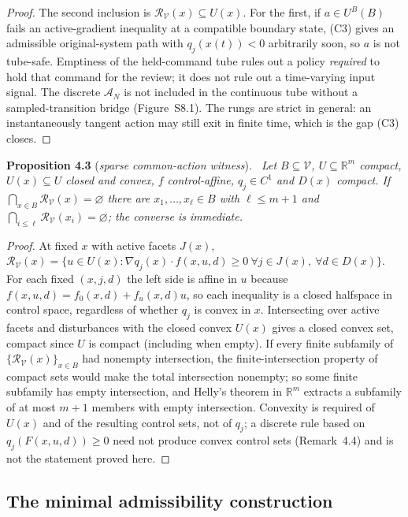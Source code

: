 \documentclass[11pt,a4paper]{article}
\theoremstyle{plain}
\theoremstyle{definition}
\theoremstyle{remark}
\newenvironment{restated}[2]{\par\medskip\noindent\textbf{#1} (\textit{#2}).\ \itshape}{\par\medskip}
\newcommand{\R}{\mathbb{R}}
\newcommand{\cV}{\mathcal{V}}
\newcommand{\cR}{\mathcal{R}}
\newcommand{\cA}{\mathcal{A}}
\newcommand{\hyp}[1]{\textup{(#1)}}
\begin{document}
\begin{proof}
The second inclusion is $\cR_\cV(x)\subseteq U(x)$. For the first, if $a\in U^B(B)$ fails an active-gradient inequality at a compatible boundary state, \hyp{C3} gives an admissible original-system path with $q_j(x(t))<0$ arbitrarily soon, so $a$ is not tube-safe. Emptiness of the held-command tube rules out a policy \emph{required} to hold that command for the review; it does not rule out a time-varying input signal. The discrete $\cA_N$ is not included in the continuous tube without a sampled-transition bridge (Figure~S8.1). The rungs are strict in general: an instantaneously tangent action may still exit in finite time, which is the gap \hyp{C3} closes.
\end{proof}

\begin{restated}{Proposition 4.3}{sparse common-action witness}\label{S:helly}
Let $B\subseteq\cV$, $U\subseteq\R^m$ compact, $U(x)\subseteq U$ closed and convex, $f$ control-affine, $q_j\in C^1$ and $D(x)$ compact. If $\bigcap_{x\in B}\cR_\cV(x)=\varnothing$ there are $x_1,\dots,x_\ell\in B$ with $\ell\le m+1$ and $\bigcap_{i\le\ell}\cR_\cV(x_i)=\varnothing$; the converse is immediate.
\end{restated}

\begin{proof}
At fixed $x$ with active facets $J(x)$, $\cR_\cV(x)=\{u\in U(x):\nabla q_j(x)\cdot f(x,u,d)\ge0\ \forall j\in J(x),\ \forall d\in D(x)\}$. For each fixed $(x,j,d)$ the left side is affine in $u$ because $f(x,u,d)=f_0(x,d)+f_u(x,d)u$, so each inequality is a closed halfspace in control space, regardless of whether $q_j$ is convex in $x$. Intersecting over active facets and disturbances with the closed convex $U(x)$ gives a closed convex set, compact since $U$ is compact (including when empty). If every finite subfamily of $\{\cR_\cV(x)\}_{x\in B}$ had nonempty intersection, the finite-intersection property of compact sets would make the total intersection nonempty; so some finite subfamily has empty intersection, and Helly's theorem in $\R^m$ \citep{helly1923} extracts a subfamily of at most $m+1$ members with empty intersection. Convexity is required of $U(x)$ and of the resulting control sets, not of $q_j$; a discrete rule based on $q_j(F(x,u,d))\ge0$ need not produce convex control sets (Remark~4.4) and is not the statement proved here.
\end{proof}

\subsection{The minimal admissibility construction}\label{S:emptiness}
\end{document}
